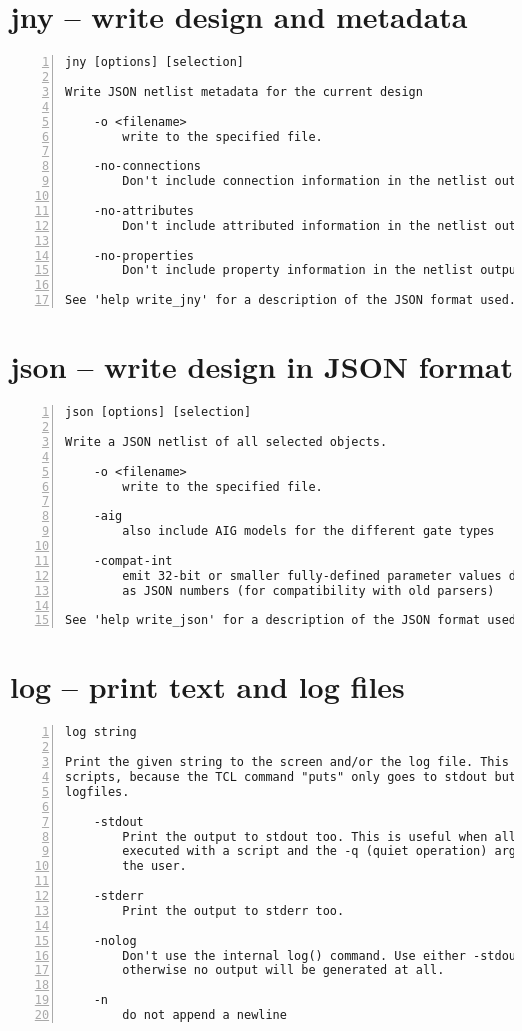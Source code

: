 \section{jny -- write design and metadata}
\label{cmd:jny}
\begin{lstlisting}[numbers=left,frame=single]
    jny [options] [selection]

Write JSON netlist metadata for the current design

    -o <filename>
        write to the specified file.

    -no-connections
        Don't include connection information in the netlist output.

    -no-attributes
        Don't include attributed information in the netlist output.

    -no-properties
        Don't include property information in the netlist output.

See 'help write_jny' for a description of the JSON format used.
\end{lstlisting}

\section{json -- write design in JSON format}
\label{cmd:json}
\begin{lstlisting}[numbers=left,frame=single]
    json [options] [selection]

Write a JSON netlist of all selected objects.

    -o <filename>
        write to the specified file.

    -aig
        also include AIG models for the different gate types

    -compat-int
        emit 32-bit or smaller fully-defined parameter values directly
        as JSON numbers (for compatibility with old parsers)

See 'help write_json' for a description of the JSON format used.
\end{lstlisting}

\section{log -- print text and log files}
\label{cmd:log}
\begin{lstlisting}[numbers=left,frame=single]
    log string

Print the given string to the screen and/or the log file. This is useful for TCL
scripts, because the TCL command "puts" only goes to stdout but not to
logfiles.

    -stdout
        Print the output to stdout too. This is useful when all Yosys is
        executed with a script and the -q (quiet operation) argument to notify
        the user.

    -stderr
        Print the output to stderr too.

    -nolog
        Don't use the internal log() command. Use either -stdout or -stderr,
        otherwise no output will be generated at all.

    -n
        do not append a newline
\end{lstlisting}

